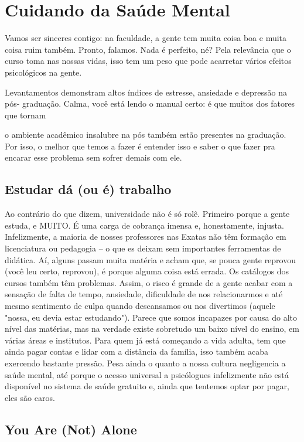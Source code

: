 \section{Cuidando da Saúde Mental}

Vamos ser sinceres contigo: na faculdade, a gente tem muita coisa boa e muita coisa
ruim também. Pronto, falamos. Nada é perfeito, né? Pela relevância que o curso toma nas
nossas vidas, isso tem um peso que pode acarretar vários efeitos psicológicos na gente.

Levantamentos demonstram altos índices de estresse, ansiedade e depressão na pós-
graduação. Calma, você está lendo o manual certo: é que muitos dos fatores que tornam

o ambiente acadêmico insalubre na pós também estão presentes na graduação.
Por isso, o melhor que temos a fazer é entender isso e saber o que fazer pra encarar
esse problema sem sofrer demais com ele.

\subsection{Estudar dá (ou é) trabalho}

Ao contrário do que dizem, universidade não é só rolê. Primeiro porque a gente
estuda, e MUITO. É uma carga de cobrança imensa e, honestamente, injusta. Infelizmente,
a maioria de nosses professores nas Exatas não têm formação em licenciatura ou
pedagogia – o que es deixam sem importantes ferramentas de didática. Aí, alguns
passam muita matéria e acham que, se pouca gente reprovou (você leu certo, reprovou),
é porque alguma coisa está errada. Os catálogos dos cursos também têm problemas.
Assim, o risco é grande de a gente acabar com a sensação de falta de tempo,
ansiedade, dificuldade de nos relacionarmos e até mesmo sentimento de culpa quando
descansamos ou nos divertimos (aquele "nossa, eu devia estar estudando"). Parece que
somos incapazes por causa do alto nível das matérias, mas na verdade existe sobretudo
um baixo nível do ensino, em várias áreas e institutos. Para quem já está começando a
vida adulta, tem que ainda pagar contas e lidar com a distância da família, isso também
acaba exercendo bastante pressão. Pesa ainda o quanto a nossa cultura negligencia a
saúde mental, até porque o acesso universal a psicólogues infelizmente não está
disponível no sistema de saúde gratuito e, ainda que tentemos optar por pagar, eles são
caros.

\subsection{You Are (Not) Alone}

